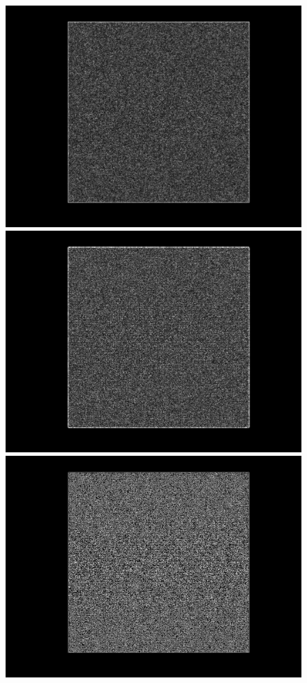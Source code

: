 \documentclass[a4paper]{article} %
\begin{document}
\begin{figure}[!htb]
  \includegraphics[width=\linewidth]{sobel_Eq_Phantom_0p500_4_1_1.jpg}
\endminipage\hfill
{}%
  \includegraphics[width=\linewidth]{lap_Eq_Phantom_0p500_4_1_1.jpg}
\endminipage\hfill
{}%
  \includegraphics[width=\linewidth]{canny_Eq_Phantom_0p500_4_1_1.jpg}

\end{figure}
\end{document}
